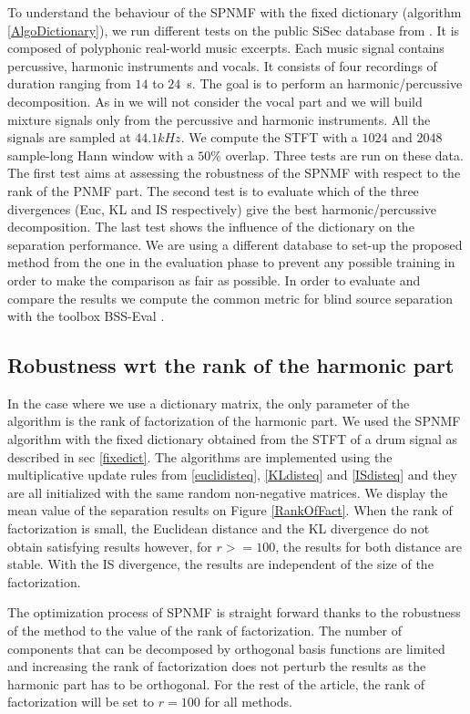 \documentclass[journal]{IEEEtran}
\begin{document}
To understand the behaviour of the SPNMF with the fixed dictionary (algorithm \ref{AlgoDictionary}), we run different tests on the public SiSec database from \cite{SiSec10}. It is composed of polyphonic real-world music excerpts. Each music signal contains percussive, harmonic instruments and vocals. It consists of four recordings of duration ranging from $14$ to $24$~s. The goal is to perform an harmonic/percussive decomposition. As in \cite{canadas2014percussive} we will not consider the vocal part and we will build mixture signals only from the percussive and harmonic instruments. All the signals are sampled at $44.1kHz$. We compute the STFT with a $1024$ and $2048$ sample-long Hann window with a $50\%$ overlap.
Three tests are run on these data. The first test aims at assessing the robustness of the SPNMF with respect to the rank of the PNMF part. The second test is to evaluate which of the three divergences (Euc, KL and IS respectively) give the best harmonic/percussive decomposition. The last test shows the influence of the dictionary on the separation performance. We are using a different database to set-up the proposed method from the one in the evaluation phase to prevent any possible training in order to make the comparison as fair as possible. 
In order to evaluate and compare the results we compute the common metric for blind source separation with the toolbox BSS-Eval \cite{bsseval}. 


\subsection{Robustness wrt the rank of the harmonic part}\label{setup:rank}

In the case where we use a dictionary matrix, the only parameter of the algorithm is the rank of factorization of the harmonic part. We used the SPNMF algorithm with the fixed dictionary obtained from the STFT of a drum signal as described in sec \ref{fixedict}. The algorithms are implemented using the multiplicative update rules from \ref{euclidisteq}, \ref{KLdisteq} and \ref{ISdisteq} and they are all initialized with the same random non-negative matrices. 
We display the mean value of the separation results on Figure \ref{RankOfFact}. When the rank of factorization is small, the Euclidean distance and the KL divergence do not obtain satisfying results however, for $r>=100$, the results for both distance are stable. With the IS divergence, the results are independent of the size of the factorization.

The optimization process of SPNMF is straight forward thanks to the robustness of the method to the value of the rank of factorization. The number of components that can be decomposed by orthogonal basis functions are limited and increasing the rank of factorization does not perturb the results as the harmonic part has to be orthogonal. For the rest of the article, the rank of factorization will be set to $r=100$ for all methods.
\end{document}
